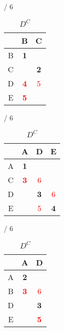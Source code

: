 \documentclass[a4paper, 11 pt, article, accentcolor=tud7b]{tudreport}
\begin{document}
	\begin{table}[h]
	  \begin{subtable}[b]{\textwidth / 6}
	    \begin{tabular}{| c | c | c |}
	      \hline
	        & B                   & C          \\ \hline
	      B & \textbf{1}          &            \\ \hline
	      C &                     & \textbf{2} \\ \hline
	      D & \textbf{\textcolor{red}{4}} & \textcolor{red}{5} \\ \hline
	      E & \textbf{\textcolor{red}{5}} &            \\ \hline
	    \end{tabular}
	    \caption{$D^{A}$}
	  \end{subtable}
	  \hfill
	  \begin{subtable}[b]{\textwidth / 6}
	    \begin{tabular}{| c | c | c | c |}
	    \hline
	      & A                           & D                  & E                  \\ \hline
	    A & \textbf{1}                  &                    &                    \\ \hline
	    C & \textbf{\textcolor{red}{3}} & \textcolor{red}{6} &                    \\ \hline
	    D &                             & \textbf{3}         & \textcolor{red}{6} \\ \hline
	    E &                             & \textcolor{red}{5} & \textbf{4}         \\ \hline
	    \end{tabular}
	    \caption{$D^{B}$}
	  \end{subtable}
	  \hfill
	  \begin{subtable}[b]{\textwidth / 6}
	    \begin{tabular}{| c | c | c |}
	    \hline
	      & A                   & D          \\ \hline
	    A & \textbf{2}          &            \\ \hline
	    B & \textbf{\textcolor{red}{3}} & \textcolor{red}{6} \\ \hline
	    D &                     & \textbf{3} \\ \hline
	    E &                     & \textbf{\textcolor{red}{5}} \\ \hline
	    \end{tabular}
	    \caption{$D^{C}$}
	  \end{subtable}

\end{table}
\end{document}
